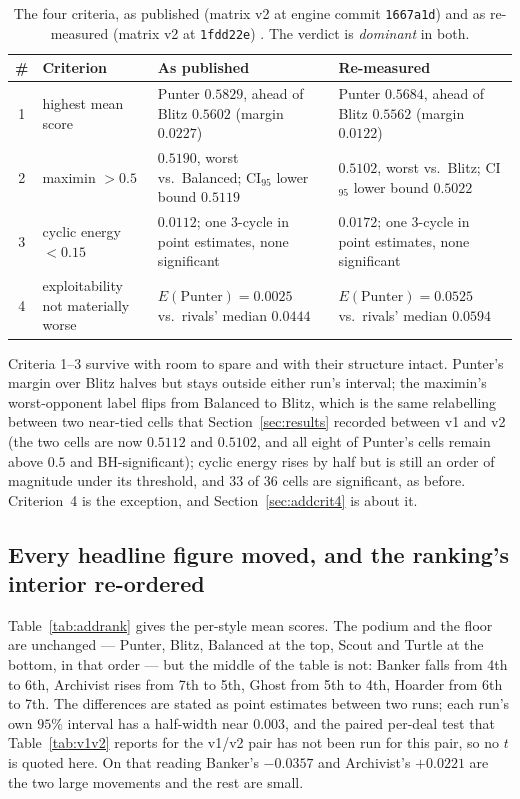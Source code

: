 \documentclass[11pt]{article}
\newcommand{\code}[1]{\texttt{#1}}
\begin{document}
\begin{table}[t]
\centering
\caption{The four criteria, as published (matrix v2 at engine commit \code{1667a1d}) and as
re-measured (matrix v2 at \code{1fdd22e}) \cite{artifact,artifactv2b}. The verdict is
\emph{dominant} in both.}
\label{tab:addcriteria}
\small
\begin{tabular}{@{}clp{4.5cm}p{4.5cm}@{}}
\toprule
\# & Criterion & As published & Re-measured \\
\midrule
1 & highest mean score & Punter $0.5829$, ahead of Blitz $0.5602$ (margin $0.0227$) &
    Punter $0.5684$, ahead of Blitz $0.5562$ (margin $0.0122$) \\
2 & maximin $> 0.5$ & $0.5190$, worst vs.\ Balanced; CI$_{95}$ lower bound $0.5119$ &
    $0.5102$, worst vs.\ Blitz; CI$_{95}$ lower bound $0.5022$ \\
3 & cyclic energy $< 0.15$ & $0.0112$; one 3-cycle in point estimates, none significant &
    $0.0172$; one 3-cycle in point estimates, none significant \\
4 & exploitability not materially worse & $E(\text{Punter}) = 0.0025$ vs.\ rivals' median
    $0.0444$ & $E(\text{Punter}) = 0.0525$ vs.\ rivals' median $0.0594$ \\
\bottomrule
\end{tabular}
\end{table}

Criteria 1--3 survive with room to spare and with their structure intact. Punter's margin over
Blitz halves but stays outside either run's interval; the maximin's worst-opponent label flips
from Balanced to Blitz, which is the same relabelling between two near-tied cells that
Section~\ref{sec:results} recorded between v1 and v2 (the two cells are now $0.5112$ and
$0.5102$, and all eight of Punter's cells remain above $0.5$ and BH-significant); cyclic energy
rises by half but is still an order of magnitude under its threshold, and 33 of 36 cells are
significant, as before. Criterion~4 is the exception, and Section~\ref{sec:addcrit4} is about
it.

\subsection{Every headline figure moved, and the ranking's interior re-ordered}

Table~\ref{tab:addrank} gives the per-style mean scores. The podium and the floor are
unchanged --- Punter, Blitz, Balanced at the top, Scout and Turtle at the bottom, in that order
--- but the middle of the table is not: Banker falls from 4th to 6th, Archivist rises from 7th
to 5th, Ghost from 5th to 4th, Hoarder from 6th to 7th. The differences are stated as point
estimates between two runs; each run's own $95\%$ interval has a half-width near $0.003$, and
the paired per-deal test that Table~\ref{tab:v1v2} reports for the v1/v2 pair has not been run
for this pair, so no $t$ is quoted here. On that reading Banker's $-0.0357$ and Archivist's
$+0.0221$ are the two large movements and the rest are small.
\end{document}
